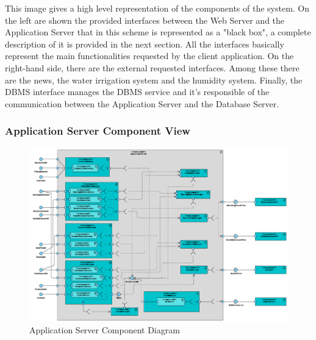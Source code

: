 \documentclass[table, 12pt]{article}
\begin{document}
This image gives a high level representation of the components of the system.
On the left are shown the provided interfaces between the Web Server and the Application Server that in this scheme is represented as a "black box", a complete description of it is provided in the next section.
All the interfaces basically represent the main functionalities requested by the client application.
On the right-hand side, there are the external requested interfaces. Among these there are the news, the water irrigation system and the humidity system.
Finally, the DBMS interface manages the DBMS service and it's responsible of the communication between the Application Server and the Database Server.

\subsubsection*{Application Server Component View}
\begin{center}
    \begin{figure}[H]
        \includegraphics[scale=0.45, center]{assets/application-server-component.png}
        \caption{Application Server Component Diagram}
        \label{fig: application_server_component_view}
    \end{figure}
\end{center}
\end{document}
